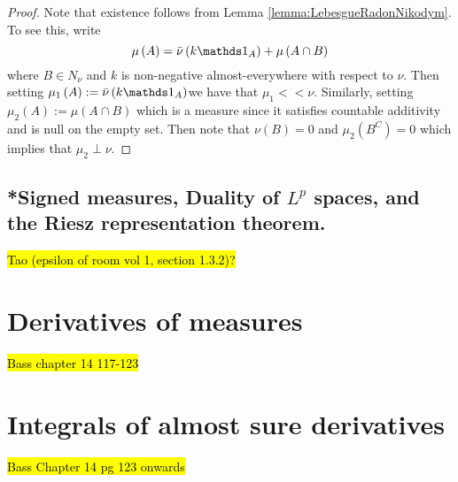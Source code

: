 \begin{proof}
Note that existence follows from Lemma \ref{lemma:LebesgueRadonNikodym}.
To see this, write 
\[
\mu\left(A\right)=\lebInt{\nu}{k\indicate_{A}}+\mu\left(A\cap B\right)
\]
where $B\in N_{\nu}$ and $k$ is non-negative almost-everywhere with
respect to $\nu.$ Then setting $\text{\ensuremath{\mu_{1}\left(A\right):=\lebInt{\nu}{k\indicate_{A}}}}$we
have that $\mu_{1}<<\nu$. Similarly, setting $\mu_{2}\left(A\right):=\mu\left(A\cap B\right)$
which is a measure since it satisfies countable additivity and is
null on the empty set. Then note that $\nu\left(B\right)=0$ and $\mu_{2}\left(B^{C}\right)=0$
which implies that $\mu_{2}\perp\nu$.
\end{proof}

\subsection{{*}Signed measures, Duality of $L^{p}$ spaces, and the Riesz representation
theorem.}

\hl{Tao (epsilon of room vol 1, section 1.3.2)?}

\section{Derivatives of measures}

\hl{Bass chapter 14 117-123}

\section{Integrals of almost sure derivatives\label{sec:ftc}}

\hl{Bass Chapter 14 pg 123 onwards} 


